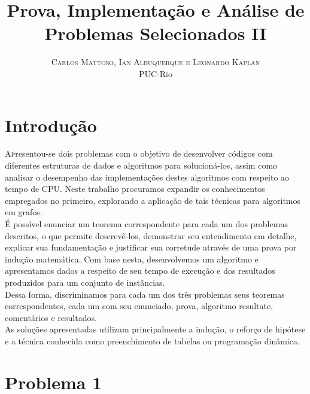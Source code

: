 \documentclass[12pt]{article}
\title{\vspace{-15mm}\fontsize{24pt}{10pt}\selectfont\textbf{Prova, Implementação e Análise de Problemas Selecionados II}} %
\author{
\large
\textsc{Carlos Mattoso, Ian Albuquerque e Leonardo Kaplan}\\[2mm] %
\normalsize PUC-Rio \\ %
}
\date{}
\begin{document}
\maketitle %

\thispagestyle{fancy} %



\section{Introdução}

\lettrine[nindent=0em,lines=3]{A}presentou-se dois problemas com o objetivo de desenvolver códigos com diferentes estruturas de dados e algoritmos para solucioná-los, assim como analisar o desempenho das implementações destes algoritmos com respeito ao tempo de CPU. Neste trabalho procuramos expandir os conhecimentos empregados no primeiro, explorando a aplicação de tais técnicas para algoritmos em grafos.\\

É possível enunciar um teorema correspondente para cada um dos problemas descritos, o que permite descrevê-los, demonstrar seu entendimento em detalhe, explicar sua fundamentação e justificar sua corretude através de uma prova por indução matemática. Com base nesta, desenvolvemos um algoritmo e apresentamos dados a respeito de seu tempo de execução e dos resultados produzidos para um conjunto de instâncias.\\

Dessa forma, discriminamos para cada um dos três problemas seus teoremas correspondentes, cada um com seu enunciado, prova,  algoritmo resultate, comentários e resultados.\\

As soluções apresentadas utilizam principalmente a indução, o reforço de hipótese e a técnica conhecida como preenchimento de tabelas ou programação dinâmica.\\
\section{Problema 1}
\end{document}
